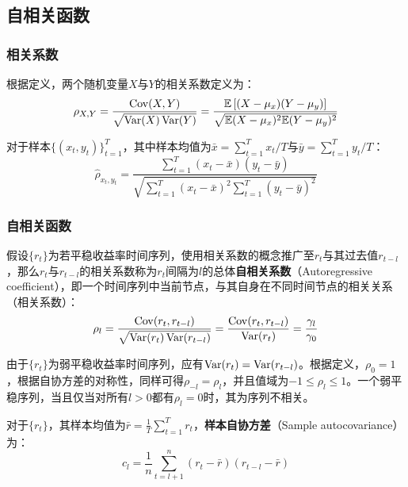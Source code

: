 \documentclass[11pt]{article}
\begin{document}
\subsection{自相关函数}

\subsubsection{相关系数}

根据定义，两个随机变量$X$与$Y$的相关系数定义为：
\begin{equation*}
    \rho_{X,Y} = \frac{\operatorname{Cov}(X,Y)}{\sqrt{\operatorname{Var}(X)\operatorname{Var}(Y)}}
    = \frac{\mathbb{E}\left[(X-\mu_x)(Y-\mu_y)\right]}{\sqrt{\mathbb{E}(X-\mu_x)^2 \mathbb{E}(Y-\mu_y)^2}}
\end{equation*}

对于样本$\{(x_t,y_t)\}_{t=1}^{T}$，其中样本均值为$\bar{x}=\sum_{t=1}^{T}x_t/T$与$\bar{y}=\sum_{t=1}^{T}y_t/T$：
\begin{equation*}
    \hat{\rho}_{x_t,y_t} = \frac{\sum_{t=1}^{T}(x_t-\bar{x})(y_t-\bar{y})}{\sqrt{\sum_{t=1}^{T}(x_t-\bar{x})^2 \sum_{t=1}^{T}(y_t-\bar{y})^2}}
\end{equation*}

\subsubsection{自相关函数}

假设$\{r_t\}$为若平稳收益率时间序列，使用相关系数的概念推广至$r_t$与其过去值$r_{t-l}$，那么$r_t$与$r_{t-l}$的相关系数称为$r_{t}$间隔为$l$的总体\textbf{自相关系数}（Autoregressive coefficient），即一个时间序列中当前节点，与其自身在不同时间节点的相关关系（相关系数）：
\begin{equation*}
    \rho_l = \frac{\operatorname{Cov}(r_t,r_{t-l})}{\sqrt{\operatorname{Var}(r_t)\operatorname{Var}(r_{t-l})}} 
    = \frac{\operatorname{Cov}(r_t,r_{t-l})}{\operatorname{Var}(r_t)}
    = \frac{\gamma_l}{\gamma_0}
\end{equation*}

由于$\{r_t\}$为弱平稳收益率时间序列，应有$\operatorname{Var}(r_t) = \operatorname{Var}(r_{t-l})$。根据定义，$\rho_0=1$，根据自协方差的对称性，同样可得$\rho_{-l}=\rho_l$，并且值域为$-1 \leq \rho_l \leq 1$。一个弱平稳序列，当且仅当对所有$l>0$都有$\rho_l=0$时，其为序列不相关。

对于$\{r_t\}$，其样本均值为$\bar{r}=\frac{1}{T} \sum_{t=1}^{T} r_t$，\textbf{样本自协方差}（Sample autocovariance）为：
\begin{equation*}
    c_l = \frac{1}{n} \sum_{t=l+1}^{n} (r_t-\bar{r})(r_{t-l}-\bar{r})
\end{equation*}
\end{document}
